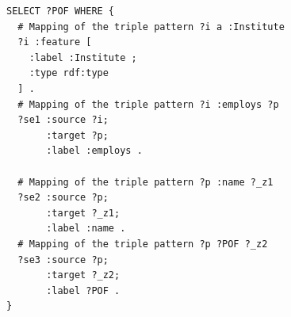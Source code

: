 \begin{verbatim}
SELECT ?POF WHERE {
  # Mapping of the triple pattern ?i a :Institute
  ?i :feature [
    :label :Institute ;
    :type rdf:type
  ] .
  # Mapping of the triple pattern ?i :employs ?p
  ?se1 :source ?i;
       :target ?p;
       :label :employs .
 
  # Mapping of the triple pattern ?p :name ?_z1
  ?se2 :source ?p;
       :target ?_z1;
       :label :name .
  # Mapping of the triple pattern ?p ?POF ?_z2
  ?se3 :source ?p;
       :target ?_z2;
       :label ?POF .
}
\end{verbatim}





